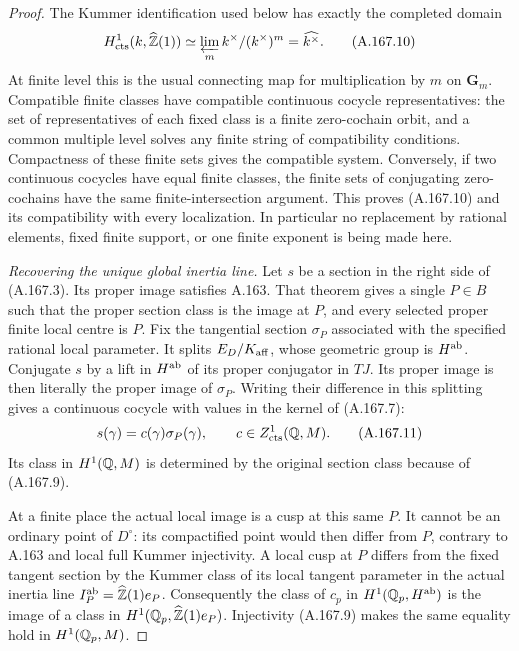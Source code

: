 \begin{proof}
The Kummer identification used below has exactly the completed domain
\[
 H^1_{\rm cts}(k,\widehat{\mathbb Z}(1))
       \simeq\varprojlim_m k^\times/(k^\times)^m
       =\widehat{k^\times}.
\tag{A.167.10}
\]
At finite level this is the usual connecting map for multiplication
by \(m\) on \(\mathbf G_m\).  Compatible finite classes have
compatible continuous cocycle representatives: the set of
representatives of each fixed class is a finite zero-cochain orbit,
and a common multiple level solves any finite string of compatibility
conditions.  Compactness of these finite sets gives the compatible
system.  Conversely, if two continuous cocycles have equal finite
classes, the finite sets of conjugating zero-cochains have the same
finite-intersection argument.  This proves (A.167.10) and its
compatibility with every localization.  In particular no replacement
by rational elements, fixed finite support, or one finite exponent is
being made here.

\emph{Recovering the unique global inertia line.}
Let \(s\) be a section in the right side of (A.167.3).  Its proper
image satisfies A.163.  That theorem gives a single \(P\in B\)
such that the proper section class is the image at \(P\), and every
selected proper finite local centre is \(P\).  Fix the tangential
section \(\sigma_P\) associated with the specified rational local
parameter.  It splits \(E_D/K_{\rm aff}\), whose geometric group
is \(H^{\rm ab}\).  Conjugate \(s\) by a lift in
\(H^{\rm ab}\) of its proper conjugator in \(TJ\).  Its proper
image is then literally the proper image of \(\sigma_P\).
Writing their difference in this splitting gives a continuous
cocycle with values in the kernel of (A.167.7):
\[
                    s(\gamma)=c(\gamma)\sigma_P(\gamma),
                    \qquad c\in Z^1_{\rm cts}(\mathbb Q,M).
\tag{A.167.11}
\]
Its class in \(H^1(\mathbb Q,M)\) is determined by the original
section class because of (A.167.9).

At a finite place the actual local image is a cusp at this same
\(P\).  It cannot be an ordinary point of \(D^\circ\): its
compactified point would then differ from \(P\), contrary to
A.163 and local full Kummer injectivity.  A local cusp at \(P\)
differs from the fixed tangent section by the Kummer class of its
local tangent parameter in the actual inertia line
\(I_P^{\rm ab}=\widehat{\mathbb Z}(1)e_P\).  Consequently the class of
\(c_p\) in \(H^1(\mathbb Q_p,H^{\rm ab})\) is the image of a class
in \(H^1(\mathbb Q_p,\widehat{\mathbb Z}(1)e_P)\).  Injectivity (A.167.9)
makes the same equality hold in \(H^1(\mathbb Q_p,M)\).


\end{proof}
